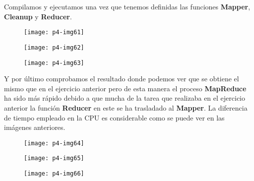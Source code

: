\documentclass[10pt]{article}
\begin{document}
Compilamos y ejecutamos una vez que tenemos definidas las funciones \textbf{Mapper}, \textbf{Cleanup} y \textbf{Reducer}. \\

\begin{figure}[H]
	\begin{center}
 		\texttt{[image: p4-img61]}
	\end{center} 
\end{figure}

\begin{figure}[H]
	\begin{center}
 		\texttt{[image: p4-img62]}
	\end{center} 
\end{figure}

\begin{figure}[H]
	\begin{center}
 		\texttt{[image: p4-img63]}
	\end{center} 
\end{figure}

Y por último comprobamos el resultado donde podemos ver que se obtiene el mismo que en el ejercicio anterior pero de esta manera el proceso \textbf{MapReduce} ha sido más rápido debido a que mucha de la tarea que realizaba en el ejercicio anterior la función \textbf{Reducer} en este se ha trasladado al \textbf{Mapper}. La diferencia de tiempo empleado en la CPU es considerable como se puede ver en las imágenes anteriores. \\

 \begin{figure}[H]
	\begin{center}
 		\texttt{[image: p4-img64]}
	\end{center} 
\end{figure}

\begin{figure}[H]
	\begin{center}
 		\texttt{[image: p4-img65]}
	\end{center} 
\end{figure}

\begin{figure}[H]
	\begin{center}
 		\texttt{[image: p4-img66]}
	\end{center} 
\end{figure}
\end{document}
